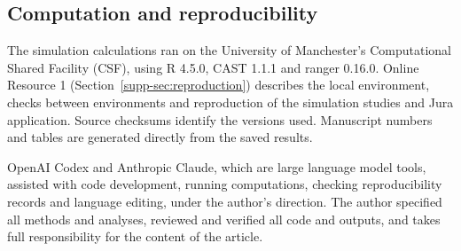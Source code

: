 \subsection{Computation and reproducibility}
\label{sec:computation}
The simulation calculations ran on the University of Manchester's Computational Shared Facility (CSF), using R 4.5.0, CAST 1.1.1 and ranger 0.16.0. Online Resource 1 (Section~\ref*{supp-sec:reproduction}) describes the local environment, checks between environments and reproduction of the simulation studies and Jura application. Source checksums identify the versions used. Manuscript numbers and tables are generated directly from the saved results.

OpenAI Codex and Anthropic Claude, which are large language model tools, assisted with code development, running computations, checking reproducibility records and language editing, under the author's direction. The author specified all methods and analyses, reviewed and verified all code and outputs, and takes full responsibility for the content of the article.
